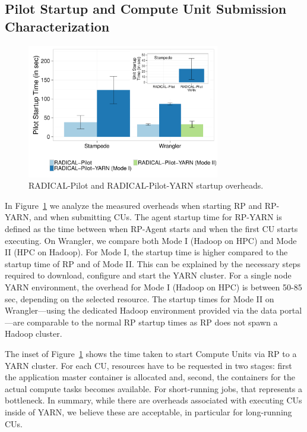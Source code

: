 \subsection{Pilot Startup and Compute Unit Submission Characterization}
\label{ssec:startup_pilot_unit}

\begin{figure}[t]
    \centering
    \includegraphics[width=0.75\textwidth]{figures/data_analytics_hpc/hpc_hadoop/pilot_unit_startup.pdf}
    \caption{RADICAL-Pilot and RADICAL-Pilot-YARN startup overheads.
        \label{fig:startup_yarn}}
\end{figure}

In Figure~\ref{fig:startup_yarn} we analyze the measured overheads when starting
RP and RP-YARN, and when submitting CUs. The
agent startup time for RP-YARN is defined as the time between when
RP-Agent starts and when the first CU starts executing. On
Wrangler, we compare both Mode I (Hadoop on HPC) and Mode II (HPC on Hadoop).
For Mode I, the startup time is higher compared to the startup time of
RP and of Mode II. This can be explained by the necessary steps
required to download, configure and start the YARN cluster. For a single node
YARN environment, the overhead for Mode I (Hadoop on HPC) is between 50-85\,sec,
depending on the selected resource. The startup times for Mode II on
Wrangler---using the dedicated Hadoop environment provided via the data
portal---are comparable to the normal RP startup times as RP does not
spawn a Hadoop cluster.

The inset of Figure~\ref{fig:startup_yarn} shows the time taken to start Compute
Units via RP to a YARN cluster. For each CU, resources have to be
requested in two stages: first the application master container is allocated
and, second, the containers for the actual compute tasks becomes available. For
short-running jobs, that represents a bottleneck. In summary, while there are
overheads associated with executing CUs inside of YARN, we believe
these are acceptable, in particular for long-running CUs.

